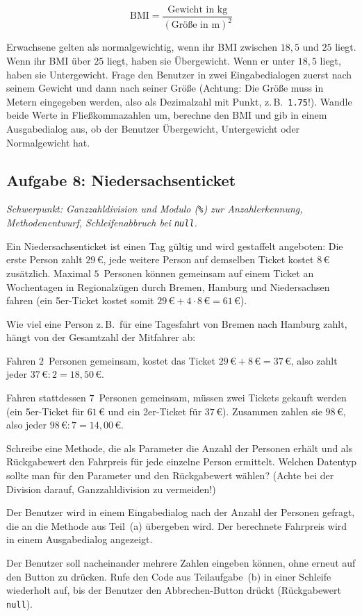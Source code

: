 \[
\textrm{BMI} = \frac{\textrm{Gewicht in kg}}{(\textrm{Größe in m})^2}
\]

Erwachsene gelten als normalgewichtig, wenn ihr BMI zwischen $18{,}5$ und $25$
liegt. Wenn ihr BMI über $25$ liegt, haben sie Übergewicht. Wenn er unter
$18{,}5$ liegt, haben sie Untergewicht. Frage den Benutzer in zwei
Eingabedialogen zuerst nach seinem Gewicht und dann nach seiner Größe (Achtung:
Die Größe muss in Metern eingegeben werden, also als Dezimalzahl mit Punkt,
z.\,B.\ \texttt{1.75}!). Wandle beide Werte in Fließkommazahlen um, berechne
den BMI und gib in einem Ausgabedialog aus, ob der Benutzer Übergewicht,
Untergewicht oder Normalgewicht hat.


\subsection{Aufgabe 8: Niedersachsenticket \tagZusatz \tagLK}
\noindent \emph{Schwerpunkt: Ganzzahldivision und Modulo (\texttt{\%}) zur Anzahlerkennung, Methodenentwurf, Schleifenabbruch bei \texttt{null}.}

Ein Niedersachsenticket ist einen Tag gültig und wird gestaffelt angeboten: Die 
erste Person zahlt $29\,\text{€}$, jede weitere Person auf demselben Ticket kostet 
$8\,\text{€}$ zusätzlich. Maximal $5$~Personen können gemeinsam auf einem Ticket 
an Wochentagen in Regionalzügen durch Bremen, Hamburg und Niedersachsen fahren 
(ein 5er-Ticket kostet somit $29\,\text{€} + 4 \cdot 8\,\text{€} = 61\,\text{€}$).

Wie viel eine Person z.\,B.\ für eine Tagesfahrt von Bremen nach Hamburg zahlt, 
hängt von der Gesamtzahl der Mitfahrer ab:
\begin{compactitem}
\item Fahren $2$~Personen gemeinsam, kostet das Ticket 
$29\,\text{€} + 8\,\text{€} = 37\,\text{€}$, also zahlt jeder 
$37\,\text{€} : 2 = 18{,}50\,\text{€}$.
\item Fahren stattdessen $7$~Personen gemeinsam, müssen zwei Tickets gekauft werden 
(ein 5er-Ticket für $61\,\text{€}$ und ein 2er-Ticket für $37\,\text{€}$). Zusammen 
zahlen sie $98\,\text{€}$, also jeder $98\,\text{€} : 7 = 14{,}00\,\text{€}$.
\end{compactitem}

\begin{compactenum}[a)]
\item Schreibe eine Methode, die als Parameter die Anzahl der Personen erhält und als 
Rückgabewert den Fahrpreis für jede einzelne Person ermittelt. Welchen Datentyp 
sollte man für den Parameter und den Rückgabewert wählen? (Achte bei der Division 
darauf, Ganzzahldivision zu vermeiden!)
\item Der Benutzer wird in einem Eingabedialog nach der Anzahl der Personen gefragt, 
die an die Methode aus Teil~(a) übergeben wird. Der berechnete Fahrpreis wird in einem 
Ausgabedialog angezeigt.
\item Der Benutzer soll nacheinander mehrere Zahlen eingeben können, ohne erneut auf 
den Button zu drücken. Rufe den Code aus Teilaufgabe~(b) in einer Schleife wiederholt 
auf, bis der Benutzer den Abbrechen-Button drückt (Rückgabewert \lstinline|null|).
\end{compactenum}


